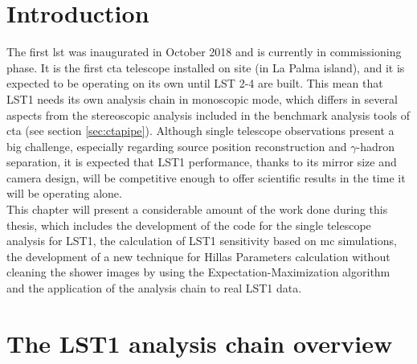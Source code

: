 \documentclass[main.tex]{subfiles}
\begin{document}
\glsresetall

\section{Introduction}

The first \gls{lst} was inaugurated in October 2018 and is currently in commissioning phase. It is the first \gls{cta} telescope installed on site (in La Palma island), and it is expected to be operating on its own until LST 2-4 are built. This mean that LST1 needs its own analysis chain in monoscopic mode, which differs in several aspects from the stereoscopic analysis included in the benchmark analysis tools of \gls{cta} (see section \ref{sec:ctapipe}). Although single telescope observations present a big challenge, especially regarding source position reconstruction and $\gamma$-hadron separation, it is expected that LST1 performance, thanks to its mirror size and camera design, will be competitive enough to offer scientific results in the time it will be operating alone.\\
This chapter will present a considerable amount of the work done during this thesis, which includes the development of the code for the single telescope analysis for LST1, the calculation of LST1 sensitivity based on \gls{mc} simulations, the development of a new technique for Hillas Parameters calculation without cleaning the shower images by using the Expectation-Maximization algorithm and the application of the analysis chain to real LST1 data. 

\section{The LST1 analysis chain overview} \label{sec:anachain}
\end{document}
